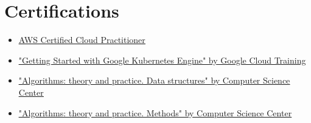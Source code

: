 \documentclass[a4paper,10pt]{article}
\makeatletter
\newcommand{\resumeItem}[1]{
  \item\small{#1}
}
\newcommand{\resumeItemListStart}{\begin{itemize}[rightmargin=0.11in]}
\newcommand{\resumeItemListEnd}{\end{itemize}}
\newcommand{\resumeTrioHeading}[3]{
  \item\small{
    \begin{tabular*}{0.96\textwidth}[t]{
      l@{\extracolsep{\fill}}c@{\extracolsep{\fill}}r
    }
      \textbf{#1} & \textit{#2} & #3
    \end{tabular*}
  }
}
\newcommand{\resumeHeadingListStart}{
  \begin{itemize}[leftmargin=0.15in, label={}]
}
\newcommand{\resumeHeadingListEnd}{\end{itemize}}
\newcommand{\hrefUline}[2]{
  \href{#1}{\uline{#2}}
}
\makeatother
\begin{document}





\section{Certifications}
  \resumeItemListStart{}
    \resumeItem{\hrefUline{https://www.credly.com/badges/968bad65-6464-49fb-b836-c53a0dd30daf/linked_in_profile}{AWS Certified Cloud Practitioner}}
    \resumeItem{\hrefUline{https://coursera.org/verify/ND55XKAHNRU4}{"Getting Started with Google Kubernetes Engine" by Google Cloud Training}}
    \resumeItem{\hrefUline{https://stepik.org/cert/151752?lang=en}{"Algorithms: theory and practice. Data structures" by Computer Science Center}}
    \resumeItem{\hrefUline{https://stepik.org/cert/39100?lang=en}{"Algorithms: theory and practice. Methods" by Computer Science Center}}
  \resumeItemListEnd{}
\end{document}
